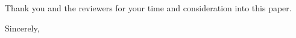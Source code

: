 \documentclass[11pt, a4paper]{letter} %
\renewcommand{\closing}[1]{
	\vspace{2.5mm} %
	\noindent %
	\hspace*{\longindentation} %
	\parbox{\indentedwidth}{
		\raggedright
		#1 %
		\vskip 1.65cm %
		\fromsig %
	}
}
\begin{document}
\begin{letter}
Thank you and the reviewers for your time and consideration into this paper. 

\closing{Sincerely,}






\end{letter}
\end{document}
